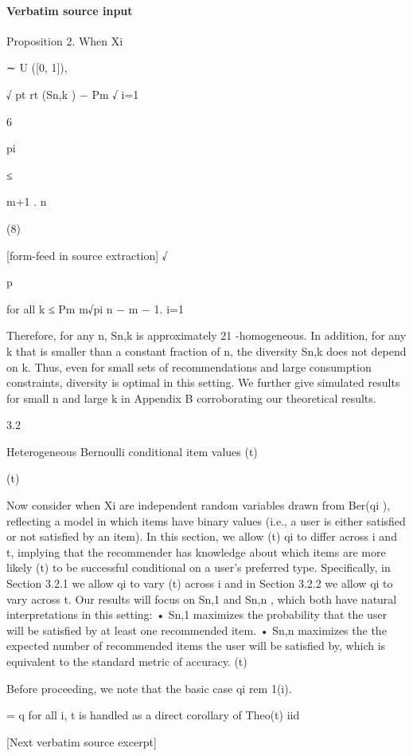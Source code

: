 \documentclass[10pt]{article}
\begin{document}
\paragraph{Verbatim source input}
\begin{ReviewVerbatim}
Proposition 2. When Xi

∼ U ([0, 1]),

√
pt
rt (Sn,k ) − Pm √
i=1

6

pi

≤

m+1
.
n

(8)


[form-feed in source extraction]
√

p

for all k ≤ Pm m√pi n − m − 1.
i=1

Therefore, for any n, Sn,k is approximately 21 -homogeneous. In addition, for any k that is smaller than a
constant fraction of n, the diversity Sn,k does not depend on k. Thus, even for small sets of recommendations
and large consumption constraints, diversity is optimal in this setting. We further give simulated results for
small n and large k in Appendix B corroborating our theoretical results.

3.2

Heterogeneous Bernoulli conditional item values
(t)

(t)

Now consider when Xi are independent random variables drawn from Ber(qi ), reflecting a model in which
items have binary values (i.e., a user is either satisfied or not satisfied by an item). In this section, we allow
(t)
qi to differ across i and t, implying that the recommender has knowledge about which items are more likely
(t)
to be successful conditional on a user’s preferred type. Specifically, in Section 3.2.1 we allow qi to vary
(t)
across i and in Section 3.2.2 we allow qi to vary across t.
Our results will focus on Sn,1 and Sn,n , which both have natural interpretations in this setting:
• Sn,1 maximizes the probability that the user will be satisfied by at least one recommended item.
• Sn,n maximizes the the expected number of recommended items the user will be satisfied by, which is
equivalent to the standard metric of accuracy.
(t)

Before proceeding, we note that the basic case qi
rem 1(i).

= q for all i, t is handled as a direct corollary of Theo(t) iid

[Next verbatim source excerpt]


\end{ReviewVerbatim}
\end{document}
